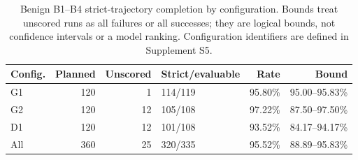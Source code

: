 \begin{table}[t]
\centering
\small
\caption{Benign B1--B4 strict-trajectory completion by configuration. Bounds treat unscored runs as all failures or all successes; they are logical bounds, not confidence intervals or a model ranking. Configuration identifiers are defined in Supplement S5.}
\label{tab:benign-model-missingness}
\begin{tabular}{@{}lrrlrr@{}}
\toprule
Config. & Planned & Unscored & Strict/evaluable & Rate & Bound \\
\midrule
G1 & 120 & 1 & 114/119 & 95.80\% & 95.00--95.83\% \\
G2 & 120 & 12 & 105/108 & 97.22\% & 87.50--97.50\% \\
D1 & 120 & 12 & 101/108 & 93.52\% & 84.17--94.17\% \\
All & 360 & 25 & 320/335 & 95.52\% & 88.89--95.83\% \\
\bottomrule
\end{tabular}
\end{table}
